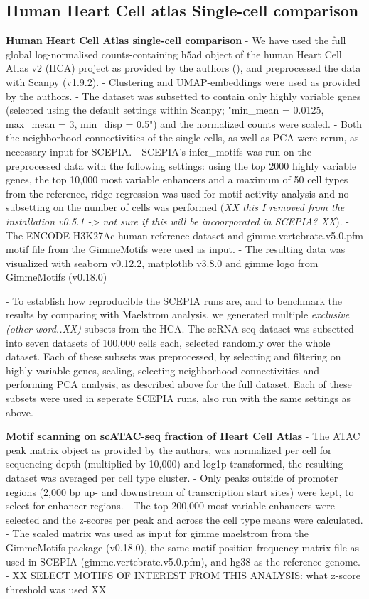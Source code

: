 \subsection{Human Heart Cell atlas Single-cell comparison}
\textbf{Human Heart Cell Atlas single-cell comparison }
- We have used the full global log-normalised counts-containing h5ad object of the human Heart Cell Atlas v2 (HCA) project as provided by the authors (\cite{Kanemaru2023}), and preprocessed the data with Scanpy (v1.9.2). 
- Clustering and UMAP-embeddings were used as provided by the authors.
- The dataset was subsetted to contain only highly variable genes (selected using the default settings within Scanpy; "min\_mean = 0.0125, max\_mean = 3, min\_disp = 0.5") and the normalized counts were scaled. 
- Both the neighborhood connectivities of the single cells, as well as PCA were rerun, as necessary input for SCEPIA. 
- SCEPIA's infer\_motifs was run on the preprocessed data with the following settings: using the top 2000 highly variable genes, the top 10,000 most variable enhancers and a maximum of 50 cell types from the reference, ridge regression was used for motif activity analysis and no subsetting on the number of cells was performed (\textit{XX this I removed from the installation v0.5.1 -> not sure if this will be incoorporated in SCEPIA? XX}). 
- The ENCODE H3K27Ac human reference dataset and gimme.vertebrate.v5.0.pfm motif file from the GimmeMotifs were used as input. 
- The resulting data was visualized with seaborn v0.12.2, matplotlib v3.8.0 and gimme logo from GimmeMotifs (v0.18.0)

- To establish how reproducible the SCEPIA runs are, and to benchmark the results by comparing with Maelstrom analysis, we generated multiple \textit{exclusive (other word..XX)} subsets from the HCA. The scRNA-seq dataset was subsetted into seven datasets of 100,000 cells each, selected randomly over the whole dataset. Each of these subsets was preprocessed, by selecting and filtering on highly variable genes, scaling, selecting neighborhood connectivities and performing PCA analysis, as described above for the full dataset. Each of these subsets were used in seperate SCEPIA runs, also run with the same settings as above. 


\textbf{Motif scanning on scATAC-seq fraction of Heart Cell Atlas}
- The ATAC peak matrix object as provided by the authors, was normalized per cell for sequencing depth (multiplied by 10,000) and log1p transformed, the resulting dataset was averaged per cell type cluster.  
- Only peaks outside of promoter regions (2,000 bp up- and downstream of transcription start sites) were kept, to select for enhancer regions. 
- The top 200,000 most variable enhancers were selected and the z-scores per peak and across the cell type means were calculated.
- The scaled matrix was used as input for gimme maelstrom from the GimmeMotifs package (v0.18.0), the same motif position frequency matrix file as used in SCEPIA (gimme.vertebrate.v5.0.pfm), and hg38 as the reference genome. 
- XX SELECT MOTIFS OF INTEREST FROM THIS ANALYSIS: what z-score threshold was used XX

